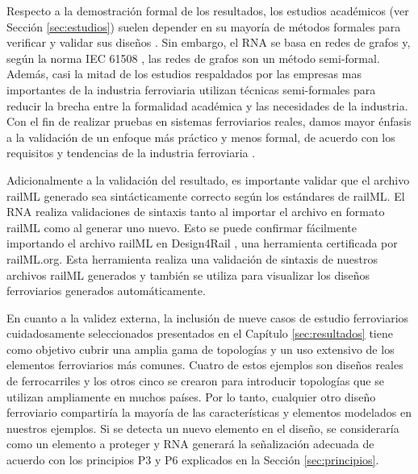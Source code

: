     Respecto a la demostración formal de los resultados, los estudios académicos (ver Sección \ref{sec:estudios}) suelen depender en su mayoría de métodos formales para verificar y validar sus diseños \cite{Paper_20,Paper_55,Paper_184,Paper_144,Paper_87,Paper_186,Paper_187,Paper_188,Paper_89,Paper_141,Paper_161,Paper_164,Paper_165,Paper_171,Paper_189,Paper_172,Paper_174,Paper_177,Paper_178}. Sin embargo, el RNA se basa en redes de grafos y, según la norma IEC 61508 \cite{Paper_63,Paper_77,Paper_78,Paper_79,Paper_80,Paper_81,Paper_82,Paper_83}, las redes de grafos son un método semi-formal. Además, casi la mitad de los estudios respaldados por las empresas mas importantes de la industria ferroviaria utilizan técnicas semi-formales \cite{Paper_44,Paper_59,Paper_60,Paper_88,Paper_94,Paper_95,Paper_123,Paper_196,Paper_145,Paper_147,Paper_148,Paper_173} para reducir la brecha entre la formalidad académica y las necesidades de la industria. Con el fin de realizar pruebas en sistemas ferroviarios reales, damos mayor énfasis a la validación de un enfoque más práctico y menos formal, de acuerdo con los requisitos y tendencias de la industria ferroviaria \cite{Paper_51,Paper_52,Paper_57,Paper_58,Paper_61,Paper_67,Paper_70,Paper_71,Paper_72,Paper_73,Paper_74,Paper_75,Paper_76,Paper_77,Paper_84,Paper_129,Paper_134,Paper_152,Paper_166,Paper_167}.
    
    Adicionalmente a la validación del resultado, es importante validar que el archivo railML generado sea sintácticamente correcto según los estándares de railML. El RNA realiza validaciones de sintaxis tanto al importar el archivo en formato railML como al generar uno nuevo. Esto se puede confirmar fácilmente importando el archivo railML en Design4Rail \cite{DESIGN4RAIL}, una herramienta certificada por railML.org. Esta herramienta realiza una validación de sintaxis de nuestros archivos railML generados y también se utiliza para visualizar los diseños ferroviarios generados automáticamente.

    En cuanto a la validez externa, la inclusión de nueve casos de estudio ferroviarios cuidadosamente seleccionados presentados en el Capítulo \ref{sec:resultados} tiene como objetivo cubrir una amplia gama de topologías y un uso extensivo de los elementos ferroviarios más comunes. Cuatro de estos ejemplos son diseños reales de ferrocarriles y los otros cinco se crearon para introducir topologías que se utilizan ampliamente en muchos países. Por lo tanto, cualquier otro diseño ferroviario compartiría la mayoría de las características y elementos modelados en nuestros ejemplos. Si se detecta un nuevo elemento en el diseño, se consideraría como un elemento a proteger y RNA generará la señalización adecuada de acuerdo con los principios P3 y P6 explicados en la Sección \ref{sec:principios}.

